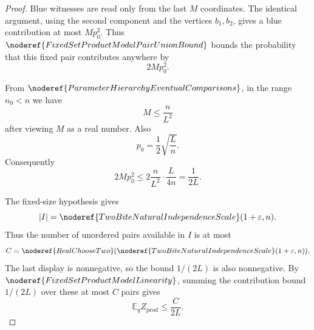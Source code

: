 \begin{proof}
Blue witnesses are read only from the last \(M\) coordinates.  The identical
argument, using the second component and the vertices \(b_1,b_2\), gives a
blue contribution at most \(Mp_0^2\).  Thus
\(\noderef{FixedSetProductModelPairUnionBound}\) bounds the probability that
this fixed pair contributes anywhere by
\[
2Mp_0^2.
\]

From \(\noderef{ParameterHierarchyEventualComparisons}\), in the range
\(n_0<n\) we have
\[
M\le \frac{n}{L^2}
\]
after viewing \(M\) as a real number.  Also
\[
p_0=\frac12\sqrt{\frac{L}{n}}.
\]
Consequently
\[
2Mp_0^2
\le 2\frac{n}{L^2}\cdot\frac{L}{4n}
=\frac1{2L}.
\]

The fixed-size hypothesis gives
\[
|I|=\noderef{TwoBiteNaturalIndependenceScale}(1+\varepsilon,n).
\]
Thus the number of unordered pairs available in \(I\) is at most
\[
C=\noderef{RealChooseTwo}
  (\noderef{TwoBiteNaturalIndependenceScale}(1+\varepsilon,n)).
\]
The last display is nonnegative, so the bound \(1/(2L)\) is also nonnegative.
By \(\noderef{FixedSetProductModelLinearity}\), summing the contribution bound
\(1/(2L)\) over these at most \(C\) pairs gives
\[
\mathbb E_q Z_{\mathrm{prod}}\le \frac{C}{2L}.
\]
\end{proof}
